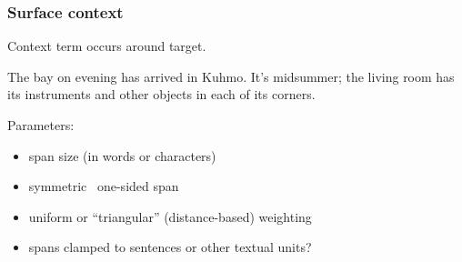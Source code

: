 \documentclass[t]{beamer} %
\begin{document}
\begin{frame}
  \frametitle{Surface context}
  
  \begin{center}
    Context term occurs  around target.
  \end{center}

  The  bay on  evening has arrived in Kuhmo. It's midsummer; the living room has its instruments and other objects in each of its corners.
  $\quad$ \primary{[L3/R3 span, $k = 6$]}
  
  \gap
  Parameters:
  \begin{itemize}
  \item span size (in words or characters)
  \item symmetric \vs\ one-sided span
  \item uniform or ``triangular'' (distance-based) weighting
  \item spans clamped to sentences or other textual units?
  \end{itemize}
\end{frame}
\end{document}
